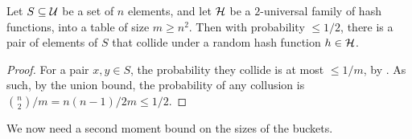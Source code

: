\begin{lemma}
    Let $S \subseteq \mathcal{U}$ be a set of $n$ elements, and let $\mathcal{H}$ be a
    $2$-universal family of hash functions, into a table of size
    $m \geq n^2$. Then with probability $\leq 1/2$, there is a pair
    of elements of $S$ that collide under a random hash function $h
    \in \mathcal{H}$.
\end{lemma}
\begin{proof}
    For a pair $x, y \in S$, the probability they collide is at most
    $\leq 1/m$, by . As such, by the
    union bound, the probability of any collusion is
    $\binom{n}{2}/m = n(n-1)/2m \leq 1/2$.
\end{proof}

We now need a second moment bound on the sizes of the buckets.

